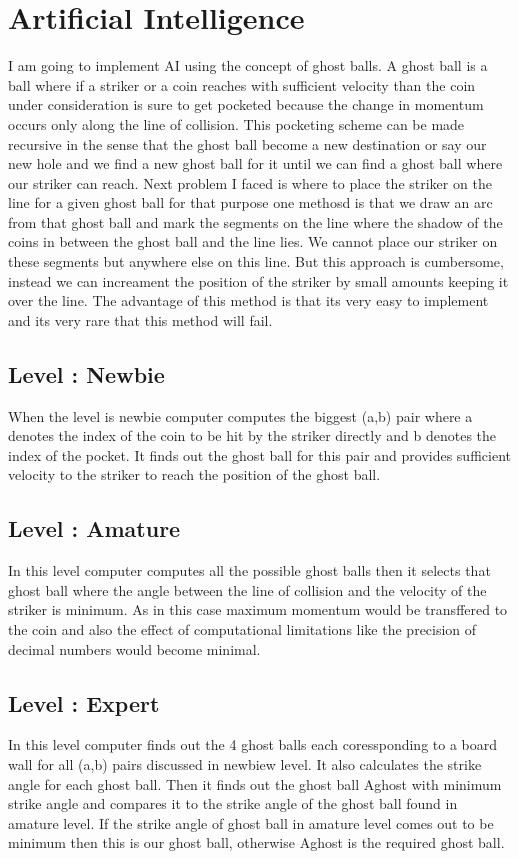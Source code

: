 \documentclass[11pt,a4paper,oneside]{report}
\begin{document}
\section{Artificial Intelligence}
I am going to implement AI using the concept of ghost balls. A ghost ball is a ball where if a striker or a coin reaches with sufficient velocity than the coin under consideration is sure to get pocketed because the change in momentum occurs only along the line of collision. This pocketing scheme can be made recursive in the sense that the ghost ball become a new destination or say our new hole and we find a new ghost ball for it until we can find a ghost ball where our striker can reach.
Next problem I faced is where to place the striker on the line for a given ghost ball for that purpose one methosd is that we draw an arc from that ghost ball and mark the segments on the line where the shadow of the coins in between the ghost ball and the line lies. We cannot place our striker on these segments but anywhere else on this line. But this approach is cumbersome, instead we can increament the position of the striker by small amounts keeping it over the line. The advantage of this method is that its very easy to implement and its very rare that this method will fail.
\subsection{Level : Newbie}
When the level is newbie computer computes the biggest (a,b) pair where a denotes the index of the coin to be hit by the striker directly and b denotes the index of the pocket.
It finds out the ghost ball for this pair and provides sufficient velocity to the striker to reach the position of the ghost ball.
\subsection{Level : Amature}
In this level computer computes all the possible ghost balls then it selects that ghost ball where the angle between the line of collision and the velocity of the striker is minimum. As in this case maximum momentum would be transffered to the coin and also the effect of computational limitations like the precision of decimal numbers would become minimal.
\subsection{Level : Expert}
In this level computer finds out the 4 ghost balls each coressponding to a board wall for all (a,b) pairs discussed in newbiew level. It also calculates the strike angle for each ghost ball. Then it finds out the ghost ball Aghost with minimum strike angle and compares it to the strike angle of the ghost ball found in amature level. If the strike angle of ghost ball in amature level comes out to be minimum then this is our ghost ball, otherwise Aghost is the required ghost ball.
\end{document}

